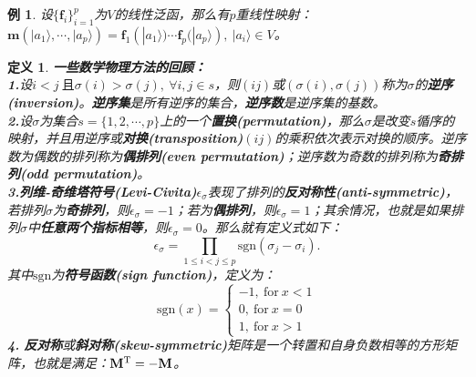 \documentclass[mathserif,hyperref,UTF8,openany,b5paper]{ctexbook}
\newtheorem{exmp}{例}[section]
\newtheorem{defn}{定义}[section]
\begin{document}
\begin{exmp}设$\{\mathbf{f}_i\}^p_{i=1}$为$V$的线性泛函，那么有$p$重线性映射：$\mathbf{m}(|a_1\rangle,\cdots,|a_p\rangle)=\mathbf{f}_1(|a_1\rangle)\cdots\mathbf{f}_p(|a_p\rangle),\ |a_i\rangle\in V$。 
\end{exmp}
\begin{defn} \textbf{一些数学物理方法的回顾：}\\
\textbf{1.}设$i<j\ \mbox{且} \sigma(i)>\sigma(j),\ \forall i,j\in s$，则$(ij)$或$(\sigma (i),\sigma(j))$称为$\sigma$的\textbf{逆序(inversion)}。\textbf{逆序集}是所有逆序的集合，\textbf{逆序数}是逆序集的基数。\\
\textbf{2.}设$\sigma$为集合$s=\{1,2,\cdots,p\}$上的一个\textbf{置换(permutation)}，那么$\sigma$是改变$s$循序的映射，并且用逆序或\textbf{对换(transposition)}$(ij)$的乘积依次表示对换的顺序。逆序数为偶数的排列称为\textbf{偶排列(even permutation)}；逆序数为奇数的排列称为\textbf{奇排列(odd permutation)}。\\
\textbf{3.}\textbf{列维-奇维塔符号(Levi-Civita)}$\epsilon_\sigma$表现了排列的\textbf{反对称性(anti-symmetric)}，若排列$\sigma$为\textbf{奇排列}，则$\epsilon_\sigma=-1$；若为\textbf{偶排列}，则$\epsilon_\sigma=1$；其余情况，也就是如果排列$\sigma$中\textbf{任意两个指标相等}，则$\epsilon_\sigma=0$。那么就有定义式如下：
\begin{equation}
\epsilon_\sigma = \prod_{1\leq i< j\leq p}\mbox{sgn}(\sigma_j-\sigma_i).
\end{equation}
其中$\mbox{sgn}$为\textbf{符号函数(sign function)}，定义为：
\begin{equation}
\mbox{sgn}(x) = \left\{ \begin{array}{rcl}
 -1,\ \mbox{for}\ x<1 \\ 
 0,\ \mbox{for}\ x=0 \\
1,\ \mbox{for}\ x>1
\end{array}\right.
\end{equation}\textbf{4. }\textbf{反对称}或\textbf{斜对称(skew-symmetric)}矩阵是一个转置和自身负数相等的方形矩阵，也就是满足：$\mathbf{M}^{\rm T}=-\mathbf{M}$。
\end{defn}
\end{document}
